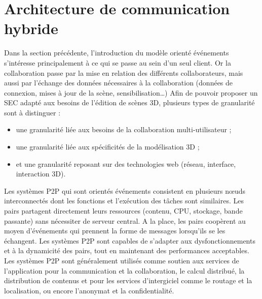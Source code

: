 \section{Architecture de communication hybride}


Dans la section précédente, l'introduction du modèle orienté événements 
s'intéresse principalement à ce qui se passe au sein d'un seul client. 
Or la collaboration passe par la mise en relation des différents collaborateurs, mais aussi par  
l'échange des données nécessaires à la collaboration (données de connexion, 
mises à jour de la scène, sensibilisation\dots)
Afin de pouvoir proposer un \gls{SEC} adapté aux besoins de l'édition de scènes 
3D, plusieurs types de granularité sont à distinguer : 
\begin{itemize}
	\item une granularité liée aux besoins de la collaboration multi-utilisateur ;
	\item une granularité liée aux spécificités de la modélisation \gls{3D} ;
	\item et une granularité reposant sur des technologies web (réseau, interface, 
	interaction \gls{3D}).
\end{itemize}

Les systèmes \gls{P2P} qui sont orientés événements consistent en plusieurs 
n\oe uds interconnectés dont les fonctions et l'exécution des tâches sont
similaires. Les pairs partagent directement leurs ressources (contenu, CPU, 
stockage, bande passante) sans nécessiter de serveur central. A la place, les 
pairs coopèrent au moyen d'événements qui prennent la forme de messages lorsqu'ils
se les échangent. Les systèmes \gls{P2P} sont capables de s'adapter aux 
dysfonctionnements et à la dynamicité des pairs, tout en maintenant des 
performances acceptables. Les systèmes \gls{P2P} sont généralement utilisés 
comme soutien aux services de l'application pour la communication et la 
collaboration, le calcul distribué, la distribution de contenus et pour les services 
d'intergiciel comme le routage et la localisation, ou encore l'anonymat et la confidentialité.

